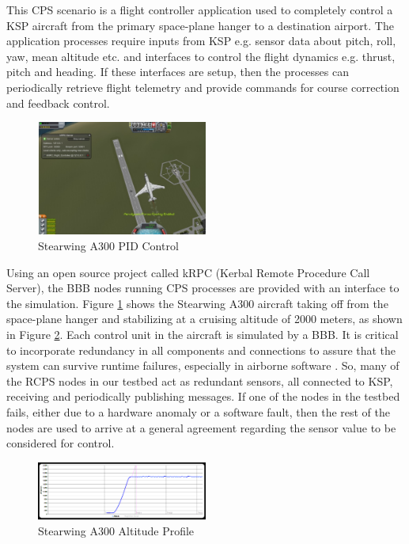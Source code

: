This CPS scenario is a flight controller application used to completely control a KSP aircraft from the primary space-plane hanger to a destination airport. The application processes require inputs from KSP e.g. sensor data about pitch, roll, yaw, mean altitude etc. and interfaces to control the flight dynamics e.g. thrust, pitch and heading. If these interfaces are setup, then the processes can periodically retrieve flight telemetry and provide commands for course correction and feedback control.

\begin{figure}[h]
	\centering
	\includegraphics[width=0.50\textwidth]{figs/ksp.png}
	\caption{Stearwing A300 PID Control}
	\label{fig:ksp}
\end{figure} 

Using an open source project called kRPC \cite{kRPC} (Kerbal Remote Procedure Call Server), the BBB nodes running CPS processes are provided with an interface to the simulation. Figure \ref{fig:ksp} shows the Stearwing A300 aircraft taking off from the space-plane hanger and stabilizing at a cruising altitude of 2000 meters, as shown in Figure \ref{fig:krpc}. Each control unit in the aircraft is simulated by a BBB. It is critical to incorporate redundancy in all components and connections to assure that the system can survive runtime failures, especially in airborne software \cite{airborne_software} \cite{kornecki2004approaches}. So, many of the RCPS nodes in our testbed act as redundant sensors, all connected to KSP, receiving and periodically publishing messages. If one of the nodes in the testbed fails, either due to a hardware anomaly or a software fault, then the rest of the nodes are used to arrive at a general agreement regarding the sensor value to be considered for control. 

\begin{figure}[h]
	\centering
	\includegraphics[width=0.50\textwidth]{figs/krpc.jpg}
	\caption{Stearwing A300 Altitude Profile}
	\label{fig:krpc}
\end{figure} 

